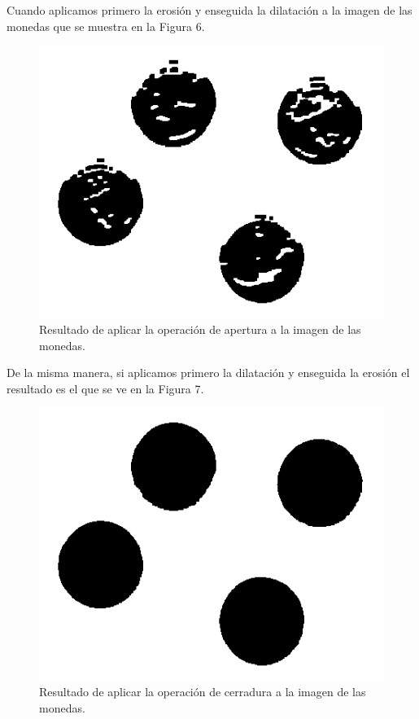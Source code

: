 \documentclass[conference]{IEEEtran}
\begin{document}
Cuando aplicamos primero la erosi\'on y enseguida la dilataci\'on a la imagen de las monedas que se muestra en la Figura 6.
\begin{figure}[h]
	\begin{center}
		\setlength{\unitlength}{0.00105in}
		\includegraphics[scale=0.30]{./images/apertura_out.png}
	\end{center}
	\caption{Resultado de aplicar la operaci\'on de apertura a la imagen de las monedas.}
\end{figure}
De la misma manera, si aplicamos primero la dilataci\'on y enseguida la erosi\'on el resultado es el que se ve en la Figura 7.
\begin{figure}[h]
	\begin{center}
		\setlength{\unitlength}{0.00105in}
		\includegraphics[scale=0.26]{./images/cerradura_out.png}
	\end{center}
	\caption{Resultado de aplicar la operaci\'on de cerradura a la imagen de las monedas.}
\end{figure}
\end{document}
